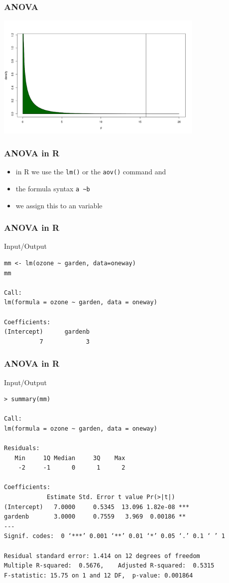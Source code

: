 \begin{frame}\frametitle{ANOVA}
\begin{center}
\includegraphics[width=10cm]{img/fdens.png}
\end{center}
\end{frame}


\begin{frame}[fragile]\frametitle{ANOVA in R}
  \begin{itemize}
  \item in R we use the \texttt{lm()} or the \texttt{aov()} command and
  \item the formula syntax \texttt{a \sim  b}
  \item we assign this to an variable
 \end{itemize}
\end{frame}


\begin{frame}[fragile]\frametitle{ANOVA in R}
  \begin{exampleblock}{Input/Output}\small
\begin{verbatim}
mm <- lm(ozone ~ garden, data=oneway)
mm

Call:
lm(formula = ozone ~ garden, data = oneway)

Coefficients:
(Intercept)      gardenb  
          7            3  
\end{verbatim}
  \end{exampleblock}
\end{frame}


\begin{frame}[fragile]\frametitle{ANOVA in R}
\footnotesize
  \begin{exampleblock}{Input/Output}\small
\begin{verbatim}
> summary(mm)

Call:
lm(formula = ozone ~ garden, data = oneway)

Residuals:
   Min     1Q Median     3Q    Max 
    -2     -1      0      1      2 

Coefficients:
            Estimate Std. Error t value Pr(>|t|)    
(Intercept)   7.0000     0.5345  13.096 1.82e-08 ***
gardenb       3.0000     0.7559   3.969  0.00186 ** 
---
Signif. codes:  0 ‘***’ 0.001 ‘**’ 0.01 ‘*’ 0.05 ‘.’ 0.1 ‘ ’ 1

Residual standard error: 1.414 on 12 degrees of freedom
Multiple R-squared:  0.5676,	Adjusted R-squared:  0.5315 
F-statistic: 15.75 on 1 and 12 DF,  p-value: 0.001864
\end{verbatim}
  \end{exampleblock}
\end{frame}

